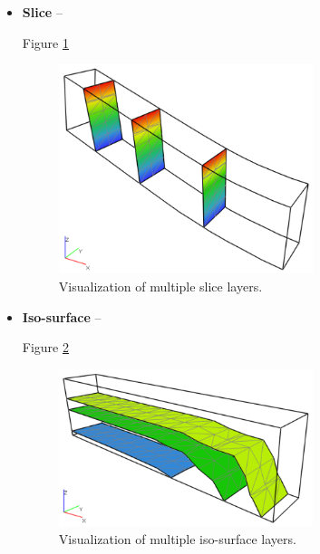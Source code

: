 \begin{itemize}
    \item \textbf{Slice} -- 
    
    Figure \ref{fig:beam-slice-layers}

    \begin{figure}[H]
        \centering
        \includegraphics[width=0.7\textwidth]{figures/chapter-data-management/beam-slice-layers}
        \decoRule
        \caption{Visualization of multiple slice layers.}
        \label{fig:beam-slice-layers}
    \end{figure}

    \item \textbf{Iso-surface} -- 

    Figure \ref{fig:beam-isosurface-layers}
    
    \begin{figure}[H]
        \centering
        \includegraphics[width=0.7\textwidth]{figures/chapter-data-management/beam-isosurface-layers}
        \decoRule
        \caption{Visualization of multiple iso-surface layers.}
        \label{fig:beam-isosurface-layers}
    \end{figure}


\end{itemize}
